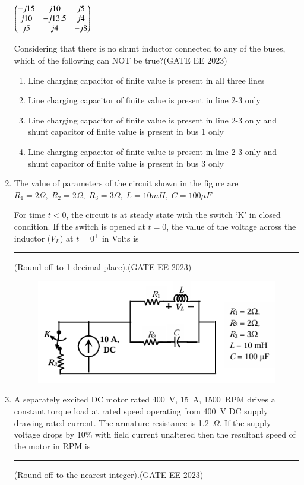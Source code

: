 \documentclass[a4paper,12pt]{exam}
\theoremstyle{remark}
\begin{document}
\begin{enumerate}
\quad\quad\quad{} \quad{} \quad{}\\
\hspace{1.1cm}
$
\begin{pmatrix}
    -j15 & j10 & j5 \\
    j10 & -j13.5 & j4 \\
    j5 & j4 & -j8
\end{pmatrix}
$


Considering that there is no shunt inductor connected to any of the buses, which of the following can NOT be true?\hfill{(GATE EE 2023)}
\begin{enumerate}
    \item Line charging capacitor of finite value is present in all three lines
    \item Line charging capacitor of finite value is present in line 2-3 only
    \item Line charging capacitor of finite value is present in line 2-3 only and shunt capacitor of finite value is present in bus 1 only
    \item Line charging capacitor of finite value is present in line 2-3 only and shunt capacitor of finite value is present in bus 3 only
\end{enumerate}

\item The value of parameters of the circuit shown in the figure are
$
R_1 = 2\Omega, \; R_2 = 2\Omega, \; R_3 = 3\Omega, \; L = 10mH, \; C = 100\mu F
$

For time $t < 0$, the circuit is at steady state with the switch `K' in closed condition. If the switch is opened at $t = 0$, the value of the voltage across the inductor ($V_L$) at $t = 0^+$ in Volts is \rule{2cm}{0.15mm} (Round off to 1 decimal place).\hfill{(GATE EE 2023)}
\begin{figure}[H]
    \centering
    \includegraphics[width=0.5\columnwidth]{figs/Q 29.png}
    \caption{}
    \label{fig:placeholder}
\end{figure}

\item A separately excited DC motor rated 400~V, 15~A, 1500~RPM drives a constant torque load at rated speed operating from 400~V DC supply drawing rated current. The armature resistance is 1.2~$\Omega$. If the supply voltage drops by 10\% with field current unaltered then the resultant speed of the motor in RPM is \rule{2cm}{0.15mm} (Round off to the nearest integer).\hfill{(GATE EE 2023)}


\end{enumerate}
\end{document}
